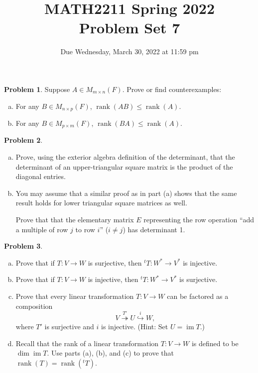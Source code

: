 \documentclass[11pt,oneside]{amsart}
\title{MATH2211 Spring 2022\\
Problem Set 7}
\author{Due Wednesday, March 30, 2022 at 11:59 pm}
\theoremstyle{definition}
\newtheorem{problem}{Problem}
\DeclareMathOperator{\im}{im}
\DeclareMathOperator{\rank}{rank}
\begin{document}
    \maketitle
    
    \begin{problem}
        Suppose $A\in M_{m\times n}(F)$. Prove or find counterexamples:
        \begin{enumerate}[(a)]
            \item For any $B\in M_{n\times p}(F)$, $\rank(AB)\leq\rank(A)$.
            \item For any $B\in M_{p\times m}(F)$, $\rank(BA)\leq\rank(A)$.
        \end{enumerate}
    \end{problem}

    \begin{problem}
        \leavevmode\begin{enumerate}[(a)]
            \item Prove, using the exterior algebra definition of the determinant, that the determinant of an upper-triangular square matrix is the product of the diagonal entries.
            \item You may assume that a similar proof as in part (a) shows that the same result holds for lower triangular square matrices as well.
            
            Prove that that the elementary matrix $E$ representing the row operation ``add a multiple of row $j$ to row $i$'' ($i\neq j$) has determinant 1.
        \end{enumerate}
    \end{problem}

    \begin{problem}
        \leavevmode\begin{enumerate}[(a)]
            \item Prove that if $T\colon V\to W$ is surjective, then $^tT\colon W^*\to V^*$ is injective.
            \item Prove that if $T\colon V\to W$ is injective, then $^tT\colon W^*\to V^*$ is surjective.
            \item Prove that every linear transformation $T\colon V\to W$ can be factored as a composition
            \[V\overset{T'}{\twoheadrightarrow} U\overset{i}{\hookrightarrow}W,\]
            where $T'$ is surjective and $i$ is injective. (Hint: Set $U=\im T$.)
            \item Recall that the rank of a linear transformation $T\colon V\to W$ is defined to be $\dim\im T$. Use parts (a), (b), and (c) to prove that $\rank(T)=\rank(^tT)$.
        \end{enumerate}
    \end{problem}
\end{document}
